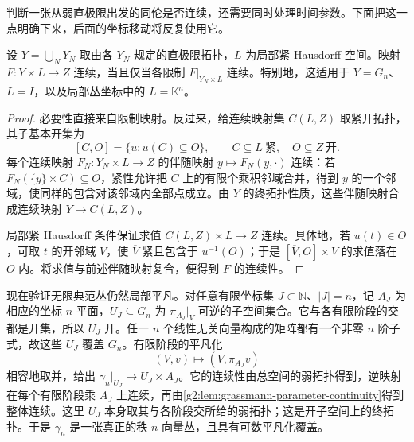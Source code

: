 判断一张从弱直极限出发的同伦是否连续，还需要同时处理时间参数。下面把这一点明确下来，后面的坐标移动将反复使用它。

\begin{lemma}\label{g2:lem:grassmann-parameter-continuity}
	设 \(Y=\bigcup_NY_N\) 取由各 \(Y_N\) 规定的直极限拓扑，\(L\) 为局部紧 Hausdorff 空间。映射 \(F:Y\times L\to Z\) 连续，当且仅当各限制 \(F|_{Y_N\times L}\) 连续。特别地，这适用于 \(Y=G_n\)、\(L=I\)，以及局部丛坐标中的 \(L=\mathbb K^n\)。
\end{lemma}
\begin{proof}
	必要性直接来自限制映射。反过来，给连续映射集 \(C(L,Z)\) 取紧开拓扑，其子基本开集为
	\[
		[C,O]=\{u:u(C)\subseteq O\},\qquad C\subseteq L\ \text{紧},\quad O\subseteq Z\ \text{开}.
	\]
	每个连续映射 \(F_N:Y_N\times L\to Z\) 的伴随映射 \(y\mapsto F_N(y,\cdot)\) 连续：若 \(F_N(\{y\}\times C)\subseteq O\)，紧性允许把 \(C\) 上的有限个乘积邻域合并，得到 \(y\) 的一个邻域，使同样的包含对该邻域内全部点成立。由 \(Y\) 的终拓扑性质，这些伴随映射合成连续映射 \(Y\to C(L,Z)\)。

	局部紧 Hausdorff 条件保证求值 \(C(L,Z)\times L\to Z\) 连续。具体地，若 \(u(t)\in O\)，可取 \(t\) 的开邻域 \(V\)，使 \(\overline V\) 紧且包含于 \(u^{-1}(O)\)；于是 \([\overline V,O]\times V\) 的求值落在 \(O\) 内。将求值与前述伴随映射复合，便得到 \(F\) 的连续性。
\end{proof}

现在验证无限典范丛仍然局部平凡。对任意有限坐标集 \(J\subset\mathbb N\)、\(|J|=n\)，记 \(A_J\) 为相应的坐标 \(n\) 平面，\(U_J\subseteq G_n\) 为 \(\pi_{A_J}|_V\) 可逆的子空间集合。它与各有限阶段的交都是开集，所以 \(U_J\) 开。任一 \(n\) 个线性无关向量构成的矩阵都有一个非零 \(n\) 阶子式，故这些 \(U_J\) 覆盖 \(G_n\)。有限阶段的平凡化
\[
	(V,v)\longmapsto(V,\pi_{A_J}v)
\]
相容地取并，给出 \(\gamma_n|_{U_J}\to U_J\times A_J\)。它的连续性由总空间的弱拓扑得到，逆映射在每个有限阶段乘 \(A_J\) 上连续，再由\cref{g2:lem:grassmann-parameter-continuity}得到整体连续。这里 \(U_J\) 本身取其与各阶段交所给的弱拓扑；这是开子空间上的终拓扑。于是 \(\gamma_n\) 是一张真正的秩 \(n\) 向量丛，且具有可数平凡化覆盖。

